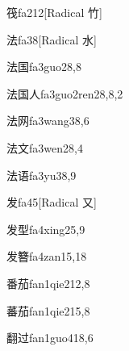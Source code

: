 \begin{entry}{筏}{fa2}{12}[Radical 竹]
\end{entry}

\begin{entry}{法}{fa3}{8}[Radical 水]
\end{entry}

\begin{entry}{法国}{fa3guo2}{8,8}
\end{entry}

\begin{entry}{法国人}{fa3guo2ren2}{8,8,2}
\end{entry}

\begin{entry}{法网}{fa3wang3}{8,6}
\end{entry}

\begin{entry}{法文}{fa3wen2}{8,4}
\end{entry}

\begin{entry}{法语}{fa3yu3}{8,9}
\end{entry}

\begin{entry}{发}{fa4}{5}[Radical ⼜]
\end{entry}

\begin{entry}{发型}{fa4xing2}{5,9}
\end{entry}

\begin{entry}{发簪}{fa4zan1}{5,18}
\end{entry}

\begin{entry}{番茄}{fan1qie2}{12,8}
\end{entry}

\begin{entry}{蕃茄}{fan1qie2}{15,8}
\end{entry}

\begin{entry}{翻过}{fan1guo4}{18,6}
\end{entry}


